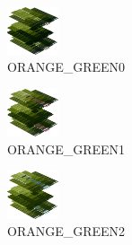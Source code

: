 \hspace{0.1cm}
\begin{minipage}[b]{0.15\linewidth}
\begin{figure}[H]                                                          
  \centering                                                             
  \begin{adjustbox}{width=1.5cm,center}                                   
  \includegraphics[width=1.5cm]{src/colorspace_colourflow/flows/colourflow_224-45.png}%
  \end{adjustbox}                                                        
\caption*{ORANGE\_GREEN0}                                           
\end{figure}                                                               
\end{minipage}
\hspace{0.1cm}
\begin{minipage}[b]{0.15\linewidth}
\begin{figure}[H]                                                          
  \centering                                                             
  \begin{adjustbox}{width=1.5cm,center}                                   
  \includegraphics[width=1.5cm]{src/colorspace_colourflow/flows/colourflow_225-45.png}%
  \end{adjustbox}                                                        
\caption*{ORANGE\_GREEN1}                                           
\end{figure}                                                               
\end{minipage}
\hspace{0.1cm}
\begin{minipage}[b]{0.15\linewidth}
\begin{figure}[H]                                                          
  \centering                                                             
  \begin{adjustbox}{width=1.5cm,center}                                   
  \includegraphics[width=1.5cm]{src/colorspace_colourflow/flows/colourflow_226-45.png}%
  \end{adjustbox}                                                        
\caption*{ORANGE\_GREEN2}                                           
\end{figure}                                                               
\end{minipage}
